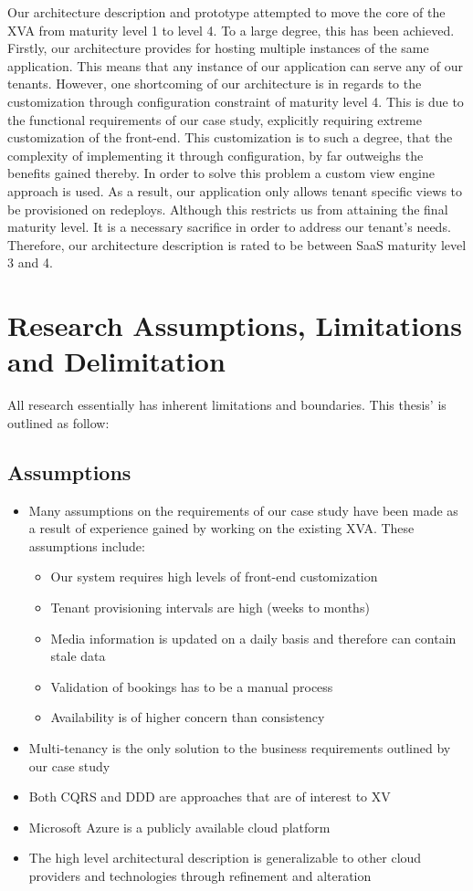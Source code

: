 Our architecture description and prototype attempted to move the core of the XVA from maturity level 1 to level 4. To a large degree, this has been achieved. Firstly, our architecture provides for hosting multiple instances of the same application. This means that any instance of our application can serve any of our tenants. However, one shortcoming of our architecture is in regards to the customization through configuration constraint of maturity level 4. This is due to the functional requirements of our case study, explicitly requiring extreme customization of the front-end.  This customization is to such a degree, that the complexity of implementing it through configuration, by far outweighs the benefits gained thereby. In order to solve this problem a custom view engine approach is used. As a result, our application only allows tenant specific views to be provisioned on redeploys. Although this restricts us from attaining the final maturity level. It is a necessary sacrifice in order to address our tenant's needs. Therefore, our architecture description is rated to be between SaaS maturity level 3 and 4. 

\section{Research Assumptions, Limitations and Delimitation}
All research essentially has inherent limitations and boundaries. This thesis' is outlined as follow:
\subsection{Assumptions}
\begin{itemize}
\item Many assumptions on the requirements of our case study have been made as a result of experience gained by working on the existing XVA. These assumptions include:
    \begin{itemize}
    \item Our system requires high levels of front-end customization
    \item Tenant provisioning intervals are high (weeks to months)
    \item Media information is updated on a daily basis and therefore can contain stale data
    \item Validation of bookings has to be a manual process
    \item Availability is of higher concern than consistency
    \end{itemize}
\item Multi-tenancy is the only solution to the business requirements outlined by our case study
\item Both CQRS and DDD are approaches that are of interest to XV
\item Microsoft Azure is a publicly available cloud platform
\item The high level architectural description is generalizable to other cloud providers and technologies through refinement and alteration
\end{itemize}

